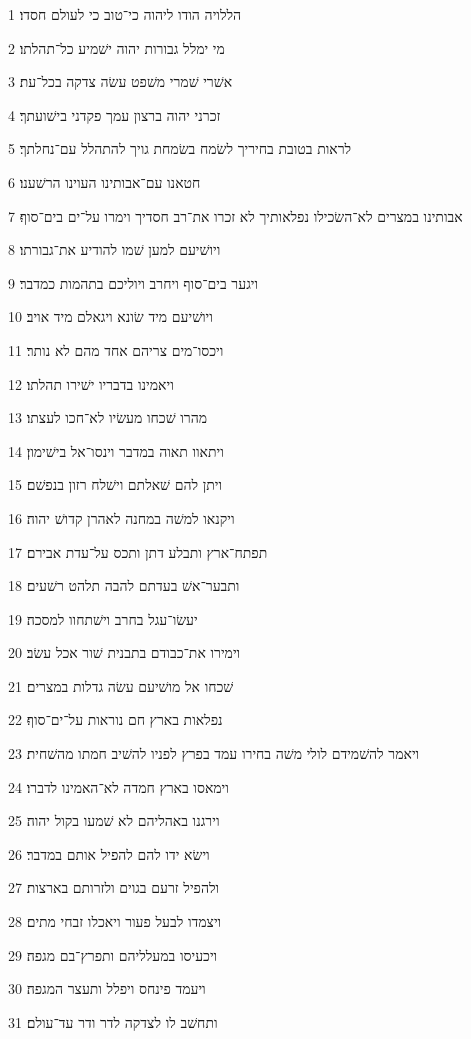 \par 1 הללויה הודו ליהוה כי־טוב כי לעולם חסדו׃
\par 2 מי ימלל גבורות יהוה ישׁמיע כל־תהלתו׃
\par 3 אשׁרי שׁמרי משׁפט עשׂה צדקה בכל־עת׃
\par 4 זכרני יהוה ברצון עמך פקדני בישׁועתך׃
\par 5 לראות בטובת בחיריך לשׂמח בשׂמחת גויך להתהלל עם־נחלתך׃
\par 6 חטאנו עם־אבותינו העוינו הרשׁענו׃
\par 7 אבותינו במצרים לא־השׂכילו נפלאותיך לא זכרו את־רב חסדיך וימרו על־ים בים־סוף׃
\par 8 ויושׁיעם למען שׁמו להודיע את־גבורתו׃
\par 9 ויגער בים־סוף ויחרב ויוליכם בתהמות כמדבר׃
\par 10 ויושׁיעם מיד שׂונא ויגאלם מיד אויב׃
\par 11 ויכסו־מים צריהם אחד מהם לא נותר׃
\par 12 ויאמינו בדבריו ישׁירו תהלתו׃
\par 13 מהרו שׁכחו מעשׂיו לא־חכו לעצתו׃
\par 14 ויתאוו תאוה במדבר וינסו־אל בישׁימון׃
\par 15 ויתן להם שׁאלתם וישׁלח רזון בנפשׁם׃
\par 16 ויקנאו למשׁה במחנה לאהרן קדושׁ יהוה׃
\par 17 תפתח־ארץ ותבלע דתן ותכס על־עדת אבירם׃
\par 18 ותבער־אשׁ בעדתם להבה תלהט רשׁעים׃
\par 19 יעשׂו־עגל בחרב וישׁתחוו למסכה׃
\par 20 וימירו את־כבודם בתבנית שׁור אכל עשׂב׃
\par 21 שׁכחו אל מושׁיעם עשׂה גדלות במצרים׃
\par 22 נפלאות בארץ חם נוראות על־ים־סוף׃
\par 23 ויאמר להשׁמידם לולי משׁה בחירו עמד בפרץ לפניו להשׁיב חמתו מהשׁחית׃
\par 24 וימאסו בארץ חמדה לא־האמינו לדברו׃
\par 25 וירגנו באהליהם לא שׁמעו בקול יהוה׃
\par 26 וישׂא ידו להם להפיל אותם במדבר׃
\par 27 ולהפיל זרעם בגוים ולזרותם בארצות׃
\par 28 ויצמדו לבעל פעור ויאכלו זבחי מתים׃
\par 29 ויכעיסו במעלליהם ותפרץ־בם מגפה׃
\par 30 ויעמד פינחס ויפלל ותעצר המגפה׃
\par 31 ותחשׁב לו לצדקה לדר ודר עד־עולם׃

